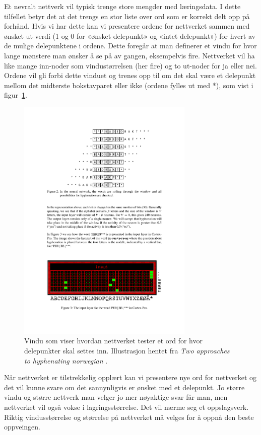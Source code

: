 Et nevralt nettverk vil typisk trenge store mengder med læringsdata. I dette tilfellet betyr det at det trengs en stor liste over ord som er korrekt delt opp på forhånd. Hvis vi har dette kan vi presentere ordene for nettverket sammen med ønsket ut-verdi (1 og 0 for «ønsket delepunkt» og «intet delepunkt») for hvert av de mulige delepunktene i ordene. Dette foregår at man definerer et vindu for hvor lange mønstere man ønsker å se på av gangen, eksempelvis fire. Nettverket vil ha like mange inn-noder som vindustørrelsen (her fire) og to ut-noder for ja eller nei. Ordene vil gli forbi dette vinduet og trenes opp til om det skal være et delepunkt mellom det midterste bokstavparet eller ikke (ordene fylles ut med *), som vist i figur~\ref{fig:vindu}.

\begin{figure}[hbt]
\centering
  \includegraphics[width=0.75\textwidth]{content/figures/vindu.pdf}
  \caption[Vindu for orddeling med nevrale nettverk]{Vindu som viser hvordan nettverket tester et ord for hvor delepunkter skal settes inn. Illustrasjon hentet fra \textit{Two approaches to hyphenating norwegian} \cite{kristensen1998two}.}
  \label{fig:vindu}
\end{figure}


Når nettverket er tilstrekkelig opplært kan vi presentere nye ord for nettverket og det vil kunne svare om det sannynligvis er ønsket med et delepunkt. Jo større vindu og større nettverk man velger jo mer nøyaktige svar får man, men nettverket vil også vokse i lagringsstørrelse. Det vil nærme seg et oppslagsverk. Riktig vindusstørrelse og størrelse på nettverket må velges for å oppnå den beste oppveingen. 

